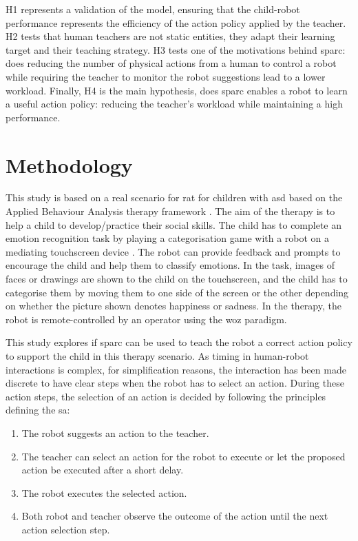 H1 represents a validation of the model, ensuring that the child-robot performance represents the efficiency of the action policy applied by the teacher. H2 tests that human teachers are not static entities, they adapt their learning target and their teaching strategy. H3 tests one of the motivations behind \gls{sparc}: does reducing the number of physical actions from a human to control a robot while requiring the teacher to monitor the robot suggestions lead to a lower workload. Finally, H4 is the main hypothesis, does \gls{sparc} enables a robot to learn a useful action policy: reducing the teacher's workload while maintaining a high performance.

\section{Methodology}

This study is based on a real scenario for \gls{rat} for children with \gls{asd} based on the Applied Behaviour Analysis therapy framework \citep{cooper2007applied}. The aim of the therapy is to help a child to develop/practice their social skills. The child has to complete an emotion recognition task by playing a categorisation game with a robot on a mediating touchscreen device \citep{baxter2012touchscreen}. The robot can provide feedback and prompts to encourage the child and help them to classify emotions. In the task, images of faces or drawings are shown to the child on the touchscreen, and the child has to categorise them by moving them to one side of the screen or the other depending on whether the picture shown denotes happiness or sadness. In the therapy, the robot is remote-controlled by an operator using the \acrlong{woz} paradigm.%

This study explores if \gls{sparc} can be used to teach the robot a correct action policy to support the child in this therapy scenario. As timing in human-robot interactions is complex, for simplification reasons, the interaction has been made discrete to have clear steps when the robot has to select an action. During these action steps, the selection of an action is decided by following the principles defining the \gls{sa}:
\begin{enumerate}
	\item The robot suggests an action to the teacher.
	\item The teacher can select an action for the robot to execute or let the proposed action be executed after a short delay.
	\item The robot executes the selected action.
	\item Both robot and teacher observe the outcome of the action until the next action selection step.
\end{enumerate}

